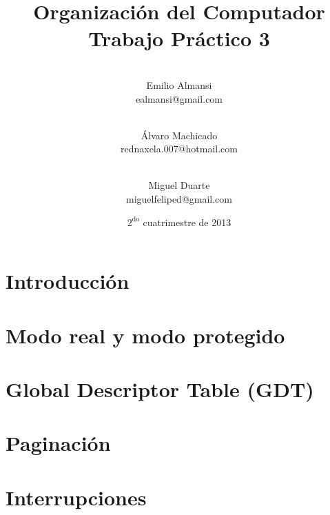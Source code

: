 \documentclass[10pt, a4paper]{article}
\newcommand{\RNum}[1]{\uppercase\expandafter{\romannumeral #1\relax}}
\begin{document}
\setlength{\parindent}{25pt}

	
	\thispagestyle{empty}
	\title{%
	\huge{Organización del Computador \RNum{2}}\\
	\vspace{4mm}
	\large{Trabajo Práctico 3}
	}
	\date{\vspace{5mm}$2^{\mathrm{do}}$ cuatrimestre de 2013}

	\author{
		\\
		{\rm Emilio Almansi }\\
		\small{ealmansi@gmail.com}
		\and
		\\
		{\rm Álvaro Machicado }\\
		\small{rednaxela.007@hotmail.com}
		\and
		\\
		{\rm Miguel Duarte}\\
		\small{miguelfeliped@gmail.com}
	} %
	\maketitle

	\vspace{10mm}


	\tableofcontents

	\clearpage
	\section{Introducción}
		
	\clearpage

	\section{Modo real y modo protegido}
		
	\clearpage

	\section{Global Descriptor Table (GDT)}
		
	\clearpage

	\section{Paginación}
		
	\clearpage

	\section{Interrupciones}
		
	\clearpage
\end{document}
